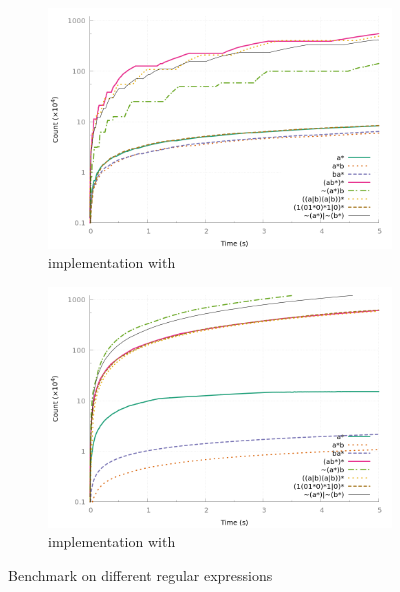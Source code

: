 \begin{figure}[h]
  \centering
  \begin{subfigure}[t]{0.45\linewidth}
    \centering
    \includegraphics[width=\linewidth]{measure/haskell_langs.png}
    \caption{\haskell implementation with }
    \label{bench:haskell:langs}
  \end{subfigure}
  \begin{subfigure}[t]{0.45\linewidth}
    \centering
    \includegraphics[width=\linewidth]{measure/ocaml_langs.png}
    \caption{\ocaml implementation with }
    \label{bench:ocaml:langs}
  \end{subfigure}
  \caption{Benchmark on different regular expressions}
  \label{bench:langs}
\end{figure}

